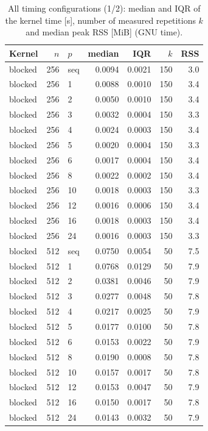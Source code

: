 \begin{table}[!ht]
\centering
\caption{All timing configurations (1/2): median and IQR of the kernel time [s], number of measured repetitions $k$ and median peak RSS [MiB] (GNU time).}
\label{tab:full1}
\scriptsize
\setlength{\tabcolsep}{3pt}
\begin{tabular}{@{}lrlrrrr@{}}
\toprule
Kernel & $n$ & $p$ & median & IQR & $k$ & RSS \\
\midrule
blocked & 256 & seq & 0.0094 & 0.0021 & 150 & 3.0 \\
blocked & 256 & 1 & 0.0088 & 0.0010 & 150 & 3.4 \\
blocked & 256 & 2 & 0.0050 & 0.0010 & 150 & 3.4 \\
blocked & 256 & 3 & 0.0032 & 0.0004 & 150 & 3.3 \\
blocked & 256 & 4 & 0.0024 & 0.0003 & 150 & 3.4 \\
blocked & 256 & 5 & 0.0020 & 0.0004 & 150 & 3.3 \\
blocked & 256 & 6 & 0.0017 & 0.0004 & 150 & 3.4 \\
blocked & 256 & 8 & 0.0022 & 0.0002 & 150 & 3.4 \\
blocked & 256 & 10 & 0.0018 & 0.0003 & 150 & 3.3 \\
blocked & 256 & 12 & 0.0016 & 0.0006 & 150 & 3.4 \\
blocked & 256 & 16 & 0.0018 & 0.0003 & 150 & 3.4 \\
blocked & 256 & 24 & 0.0016 & 0.0003 & 150 & 3.3 \\
blocked & 512 & seq & 0.0750 & 0.0054 & 50 & 7.5 \\
blocked & 512 & 1 & 0.0768 & 0.0129 & 50 & 7.9 \\
blocked & 512 & 2 & 0.0381 & 0.0046 & 50 & 7.9 \\
blocked & 512 & 3 & 0.0277 & 0.0048 & 50 & 7.8 \\
blocked & 512 & 4 & 0.0217 & 0.0025 & 50 & 7.9 \\
blocked & 512 & 5 & 0.0177 & 0.0100 & 50 & 7.8 \\
blocked & 512 & 6 & 0.0153 & 0.0022 & 50 & 7.9 \\
blocked & 512 & 8 & 0.0190 & 0.0008 & 50 & 7.8 \\
blocked & 512 & 10 & 0.0157 & 0.0017 & 50 & 7.8 \\
blocked & 512 & 12 & 0.0153 & 0.0047 & 50 & 7.9 \\
blocked & 512 & 16 & 0.0150 & 0.0017 & 50 & 7.8 \\
blocked & 512 & 24 & 0.0143 & 0.0032 & 50 & 7.9 \\

\end{tabular}
\end{table}
